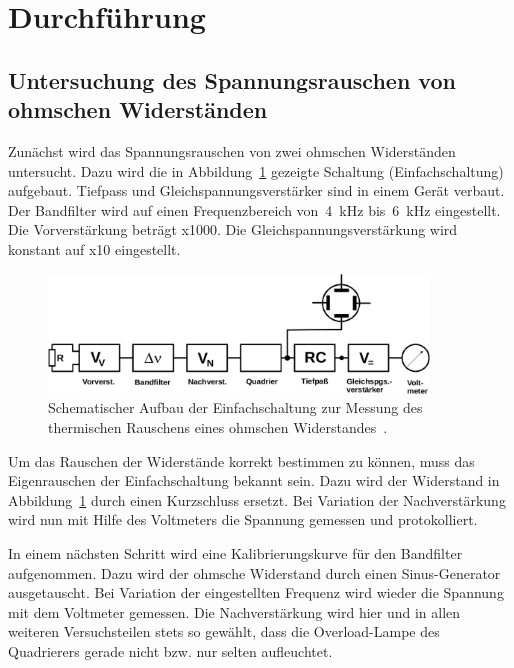 \section{Durchführung}
\label{sec:durchführung}

\subsection{Untersuchung des Spannungsrauschen von ohmschen Widerständen}

Zunächst wird das Spannungsrauschen von zwei ohmschen Widerständen untersucht.
Dazu wird die in Abbildung~\ref{fig:aufbau_einfachschaltung} gezeigte Schaltung
(Einfachschaltung) aufgebaut. Tiefpass und Gleichspannungsverstärker sind in
einem Gerät verbaut. Der Bandfilter wird auf einen Frequenzbereich
von~\SI{4}{\kilo\hertz} bis~\SI{6}{\kilo\hertz} eingestellt. Die Vorverstärkung
beträgt x1000. Die Gleichspannungsverstärkung wird konstant auf x10 eingestellt.

\begin{figure}
  \centering
  \includegraphics[width=0.9\textwidth]{figures/aufbau_einfachschaltung.pdf}
  \caption{Schematischer Aufbau der Einfachschaltung zur Messung des thermischen
  Rauschens eines ohmschen Widerstandes~\cite{V57}.}
  \label{fig:aufbau_einfachschaltung}
\end{figure}

Um das Rauschen der Widerstände korrekt bestimmen zu können, muss das
Eigenrauschen der Einfachschaltung bekannt sein. Dazu wird der Widerstand in
Abbildung~\ref{fig:aufbau_einfachschaltung} durch einen Kurzschluss ersetzt. Bei
Variation der Nachverstärkung wird nun mit Hilfe des Voltmeters die Spannung
gemessen und protokolliert.

In einem nächsten Schritt wird eine Kalibrierungskurve für den Bandfilter
aufgenommen. Dazu wird der ohmsche Widerstand durch einen Sinus-Generator
ausgetauscht. Bei Variation der eingestellten Frequenz wird wieder die Spannung
mit dem Voltmeter gemessen. Die Nachverstärkung wird hier und in allen weiteren
Versuchsteilen stets so gewählt, dass die Overload-Lampe des Quadrierers gerade
nicht bzw. nur selten aufleuchtet.

